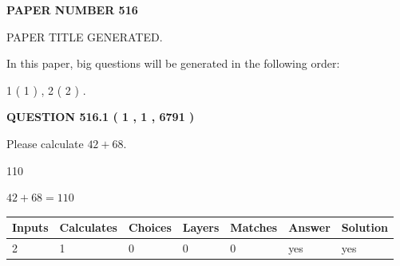 \documentclass[12pt]{article}
\begin{document}
   
 {\textbf{ \Large{ PAPER NUMBER  516  }}}
   
   
\vspace{0.2in}
   
   
   
   
   
   
   
   
 \vspace{0.2in}
 
 
 
 
   
   
 PAPER TITLE GENERATED.
   
   
   
\vspace{0.2in}
   
In this paper, big questions will be generated in the following order: 
   
   
   1 ( 1 )
 ,
   2 ( 2 )
 .
  
\vspace{0.2in}
  
{\textbf{\Large{QUESTION
516.1 
 ( 1 , 1 , 6791 )
}}}
  
  
 
Please calculate $ %
42 +  %
68 $.
 
 
 
\noindent{}
 
 

110
 
 
\noindent{}
 
 

 
 
 
\noindent{}
 
 

$ %
42 +  %
68=   %
110$
 
 
\noindent{}
 
 

 
   
   
   
   
\noindent\begin{tabular}{|l|l|l|l|l|l|l|}
 \hline
Inputs & Calculates & Choices & Layers & Matches & Answer & Solution \\ \hline
 2  & 
 1  & 
 0
  & 
 0  & 
 0  & 
  yes & 
  yes 
  \\ \hline
 \end{tabular}
   
\end{document}

